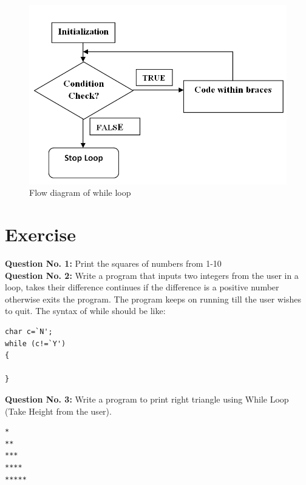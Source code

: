 \documentclass{article}
\begin{document}
\begin{figure}[H]
\centering
\label{While-Loop-Flow-Diagram}
\includegraphics[width=1.0\textwidth]{FlowDiagramWhileLoop.png}
\caption{Flow diagram of while loop}
\end{figure}

\section{Exercise}
\textbf{Question No. 1:} Print the squares of numbers from 1-10\\
\textbf{Question No. 2:} Write a program that inputs two integers from the user in a loop, takes their difference continues if the difference is a positive number otherwise exits the program. The program keeps on running till the user wishes to quit. 
The syntax of while should be like:
\begin{verbatim}
char c=`N';
while (c!=`Y')
{

}
\end{verbatim}
\textbf{Question No. 3:} Write a program to print right triangle using While Loop (Take Height from the user).
\begin{verbatim}
*
**
***
****
*****
\end{verbatim}
\end{document}

